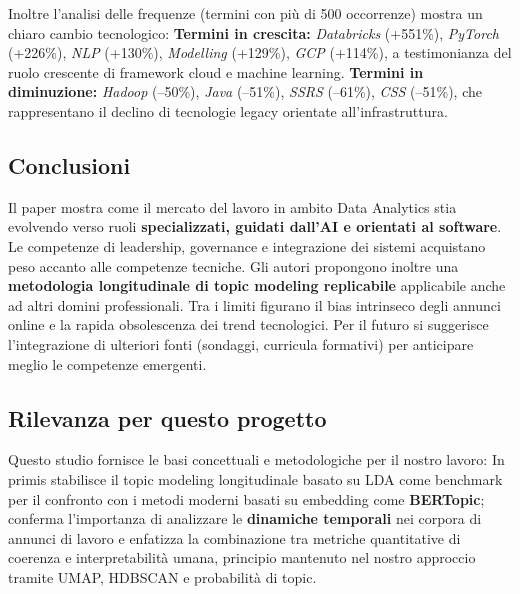 Inoltre l'analisi delle frequenze (termini con più di 500 occorrenze) mostra un chiaro cambio tecnologico:
\noindent \textbf{Termini in crescita:} \textit{Databricks} (+551\%), \textit{PyTorch} (+226\%), \textit{NLP} (+130\%), \textit{Modelling} (+129\%), \textit{GCP} (+114\%), a testimonianza del ruolo crescente di framework cloud e machine learning.
\noindent \textbf{Termini in diminuzione:} \textit{Hadoop} (--50\%), \textit{Java} (--51\%), \textit{SSRS} (--61\%), \textit{CSS} (--51\%), che rappresentano il declino di tecnologie legacy orientate all'infrastruttura.

\subsection{Conclusioni}
Il paper mostra come il mercato del lavoro in ambito Data Analytics stia evolvendo verso ruoli \textbf{specializzati, guidati dall'AI e orientati al software}.
Le competenze di leadership, governance e integrazione dei sistemi acquistano peso accanto alle competenze tecniche.
Gli autori propongono inoltre una \textbf{metodologia longitudinale di topic modeling replicabile} applicabile anche ad altri domini professionali.
Tra i limiti figurano il bias intrinseco degli annunci online e la rapida obsolescenza dei trend tecnologici.
Per il futuro si suggerisce l'integrazione di ulteriori fonti (sondaggi, curricula formativi) per anticipare meglio le competenze emergenti.

\subsection{Rilevanza per questo progetto}
Questo studio fornisce le basi concettuali e metodologiche per il nostro lavoro:
In primis stabilisce il topic modeling longitudinale basato su LDA come benchmark per il confronto con i metodi moderni basati su embedding come \textbf{BERTopic};
conferma l'importanza di analizzare le \textbf{dinamiche temporali} nei corpora di annunci di lavoro e enfatizza la combinazione tra metriche quantitative di coerenza e interpretabilità umana, principio mantenuto nel nostro approccio tramite UMAP, HDBSCAN e probabilità di topic.
